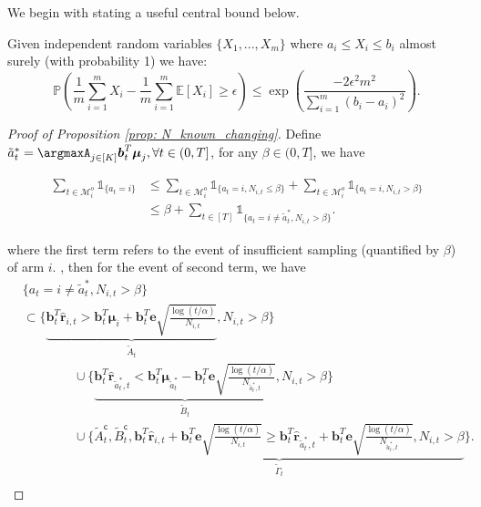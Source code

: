 We begin with stating a useful central bound below.
\begin{lemma}
\label{lemma: Hoeffding}
 Given independent random variables $\{X_1, ..., X_m \}$ where $a_i \leq X_i \leq b_i$ almost surely (with probability 1) we have:
\[
\mathbb{P} \left(\frac{1}{m} \sum_{i=1}^{m} X_i - \frac{1}{m} \sum_{i=1}^{m} \mathbb{E}[X_i] \geq \epsilon \right) \leq \exp \left(\frac{-2 \epsilon^2 m^2}{\sum_{i=1}^{m} (b_i-a_i)^2} \right).
\]
\end{lemma}

\begin{proof}[Proof of Proposition \ref{prop: N_known_changing}]

Define $\tilde{a}_{t}^{*} = \argmaxA_{j \in [K]} \boldsymbol{b}_t^T \boldsymbol{\mu}_j, \forall t \in (0,T]$, for any $\beta \in (0, T]$, we have

\begin{equation}
\begin{aligned}
\label{eq: term_1_stat}
\sum_{t \in \mathcal{M}^{o}_i} \mathds{1}_{\{a_t = i \} }
& \leq 
\sum_{t \in \mathcal{M}^{o}_i} \mathds{1}_{\{a_t = i, N_{i,t} \leq \beta \}}
+
\sum_{t \in \mathcal{M}^{o}_i} \mathds{1}_{\{a_t = i, N_{i,t} > \beta \}} \\
& \leq 
\beta
+
\sum_{t \in [T]} \mathds{1}_{\{a_t = i \neq \tilde{a}_{t}^{*}, N_{i,t} > \beta \}}.
\end{aligned}
\end{equation}



where the first term refers to the event of insufficient sampling (quantified by $\beta$) of arm $i$. 
, then for the event of second term, we have 
\begin{equation}
\begin{aligned}
\label{eq: event_ABC_t_stat1}
&{\{a_t = i \neq \tilde{a}_{t}^{*}, N_{i,t} > \beta \}} \\
& \subset
\Bigg\{ 
\underbrace{
\boldsymbol{b}_{t}^{T} \hat{\boldsymbol{r}}_{i,t} > \boldsymbol{b}_{t}^{T} \boldsymbol{\mu}_{i} + \boldsymbol{b}_{t}^{T} \boldsymbol{e} \sqrt{\frac{ \log(t/\alpha)}{N_{i,t}}}
}_{\tilde{A}_t}, 
N_{i,t} > \beta \Bigg\} \\
& \qquad \qquad \cup
\Bigg\{ 
\underbrace{
\boldsymbol{b}_{t}^{T} \hat{\boldsymbol{r}}_{\tilde{a}_{t}^{*},t} < \boldsymbol{b}_{t}^{T} \boldsymbol{\mu}_{\tilde{a}_{t}^{*}} - \boldsymbol{b}_{t}^{T} \boldsymbol{e} \sqrt{\frac{ \log(t/\alpha)}{N_{\tilde{a}_{t}^{*},t}}}
}_{\tilde{B}_t}, 
N_{i,t} > \beta \Bigg\} \\
& \qquad \qquad \cup
\Bigg\{ 
\underbrace{
\tilde{A}_t^{\mathsf{c}}, \tilde{B}_t^{\mathsf{c}}, 
\boldsymbol{b}_{t}^{T} \hat{\boldsymbol{r}}_{i,t} + \boldsymbol{b}_{t}^{T} \boldsymbol{e} \sqrt{\frac{ \log(t/\alpha)}{N_{i,t}}} 
\geq
\boldsymbol{b}_{t}^{T} \hat{\boldsymbol{r}}_{\tilde{a}_{t}^{*},t} + \boldsymbol{b}_{t}^{T} \boldsymbol{e} \sqrt{\frac{ \log(t/\alpha)}{N_{\tilde{a}_{t}^{*},t}}} , N_{i,t} > \beta }_{\tilde{\Gamma}_t} \Bigg\}.  \\
\end{aligned}
\end{equation}


\end{proof}
